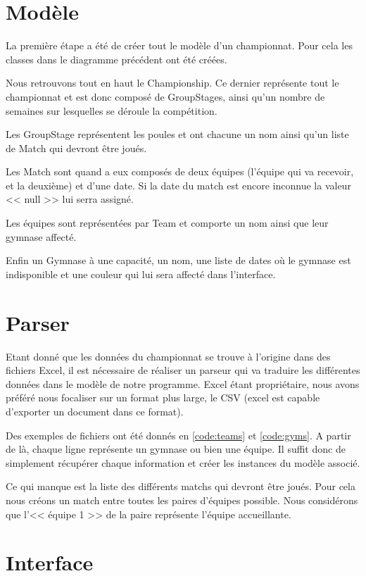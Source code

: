 \documentclass[final, noposter]{polytech/polytech}
\begin{document}
	\section{Modèle}
		
		La première étape a été de créer tout le modèle d'un championnat.
		Pour cela les classes dans le diagramme précédent ont été créées.
		
		Nous retrouvons tout en haut le Championship.
		Ce dernier représente tout le championnat et est donc composé de GroupStages, ainsi qu'un nombre de semaines sur lesquelles se déroule la compétition.
		
		Les GroupStage représentent les poules et ont chacune un nom ainsi qu'un liste de Match qui devront être joués.
		
		Les Match sont quand a eux composés de deux équipes (l'équipe qui va recevoir, et la deuxième) et d'une date.
		Si la date du match est encore inconnue la valeur << null >> lui serra assigné.
		
		Les équipes sont représentées par Team et comporte un nom ainsi que leur gymnase affecté.

		Enfin un Gymnase à une capacité, un nom, une liste de dates où le gymnase est indisponible et une couleur qui lui sera affecté dans l'interface.

	\section{Parser}
		Etant donné que les données du championnat se trouve à l'origine dans des fichiers Excel, il est nécessaire de réaliser un parseur qui va traduire les différentes données dans le modèle de notre programme.
		Excel étant propriétaire, nous avons préféré nous focaliser sur un format plus large, le CSV (excel est capable d'exporter un document dans ce format).
		
		Des exemples de fichiers ont été donnés en \autoref{code:teams} et \autoref{code:gyms}.
		A partir de là, chaque ligne représente un gymnase ou bien une équipe.
		Il suffit donc de simplement récupérer chaque information et créer les instances du modèle associé.
		
		Ce qui manque est la liste des différents matchs qui devront être joués.
		Pour cela nous créons un match entre toutes les paires d'équipes possible.
		Nous considérons que l'<< équipe 1 >> de la paire représente l'équipe accueillante.
	
	\section{Interface}
\end{document}
